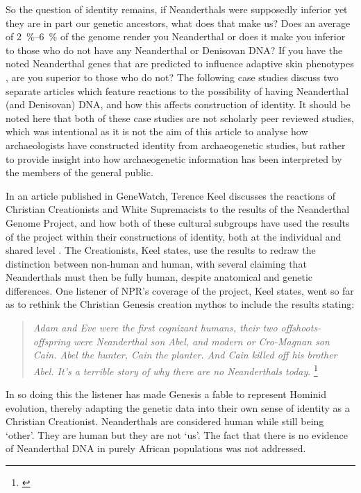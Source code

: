 So the question of identity remains, if Neanderthals were supposedly inferior yet they are in part our genetic ancestors, what does that make us? Does an average of \SIrange[range-phrase=--]{2}{6}{\percent} of the genome render you Neanderthal or does it make you inferior to those who do not have any Neanderthal or Denisovan DNA? If you have the noted Neanderthal genes that are predicted to influence adaptive skin phenotypes \parencite{Vernot_2014}, are you superior to those who do not? The following case studies discuss two separate articles which feature reactions to the possibility of having Neanderthal (and Denisovan) DNA, and how this affects construction of identity. It should be noted here that both of these case studies are not scholarly peer reviewed studies, which was intentional as it is not the aim of this article to analyse how archaeologists have constructed identity from archaeogenetic studies, but rather to provide insight into how archaeogenetic information has been interpreted by the members of the general public.


In an article published in GeneWatch, Terence Keel discusses the reactions of Christian Creationists and White Supremacists to the results of the Neanderthal Genome Project, and how both of these cultural subgroups have used the results of the project within their constructions of identity, both at the individual and shared level \parencite{Keel_2010}. The Creationists, Keel states, use the results to redraw the distinction between non-human and human, with several claiming that Neanderthals must then be fully human, despite anatomical and genetic differences. One listener of NPR’s coverage of the project, Keel states, went so far as to rethink the Christian Genesis creation mythos to include the results stating:

\blockquote{\textit{Adam and Eve were the first cognizant humans, their two offshoots- offspring were Neanderthal son Abel, and modern or Cro-Magnan son Cain. Abel the hunter, Cain the planter. And Cain killed off his brother Abel. It’s a terrible story of why there are no Neanderthals today}.
	\footnote{\textcite{Keel_2010}}}
In so doing this the listener has made Genesis a fable to represent Hominid evolution, thereby adapting the genetic data into their own sense of identity as a Christian Creationist. Neanderthals are considered human while still being ‘other’. They are human but they are not ‘us’. The fact that there is no evidence of Neanderthal DNA in purely African populations was not addressed.

